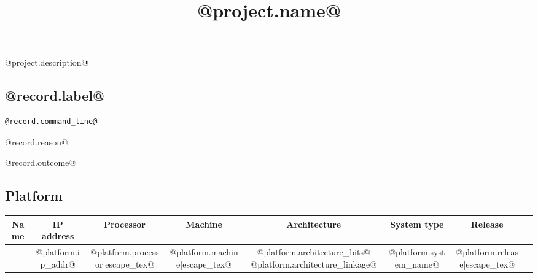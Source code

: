 \documentclass[@paper_size@, 10pt]{article}
\title{@project.name@}
\author{}
\date{}
\begin{document}
\maketitle

@project.description@

\tableofcontents

\newpage

{%

\begin{shaded}

\section{@record.label@}


\begin{lstlisting}
@record.command_line@
\end{lstlisting}




@record.reason@

@record.outcome@


\subsection{Platform}

\footnotesize
\begin{tabular}{cccccccc}
Name & IP address & Processor & Machine & Architecture & System type & Release \\ \hline
    {%
    @platform.network_name@ &
    @platform.ip_addr@ &
    @platform.processor|escape_tex@ &
    @platform.machine|escape_tex@ &
    @platform.architecture_bits@ @platform.architecture_linkage@ &
    @platform.system_name@ &
    @platform.release|escape_tex@ &
    {%
\end{tabular}
\normalsize


\end{shaded}}
\end{document}
